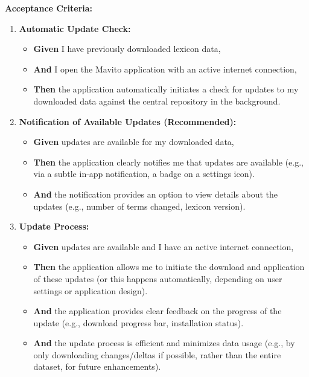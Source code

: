 \documentclass[12pt]{article}
\begin{document}
\vspace{1em}
\textbf{Acceptance Criteria:}
\begin{enumerate}
    \item \textbf{Automatic Update Check:}
    \begin{itemize}
        \item \textbf{Given} I have previously downloaded lexicon data,
        \item \textbf{And} I open the Mavito application with an active internet connection,
        \item \textbf{Then} the application automatically initiates a check for updates to my downloaded data against the central repository in the background.
    \end{itemize}

    \item \textbf{Notification of Available Updates (Recommended):}
    \begin{itemize}
        \item \textbf{Given} updates are available for my downloaded data,
        \item \textbf{Then} the application clearly notifies me that updates are available (e.g., via a subtle in-app notification, a badge on a settings icon).
        \item \textbf{And} the notification provides an option to view details about the updates (e.g., number of terms changed, lexicon version).
    \end{itemize}

    \item \textbf{Update Process:}
    \begin{itemize}
        \item \textbf{Given} updates are available and I have an active internet connection,
        \item \textbf{Then} the application allows me to initiate the download and application of these updates (or this happens automatically, depending on user settings or application design).
        \item \textbf{And} the application provides clear feedback on the progress of the update (e.g., download progress bar, installation status).
        \item \textbf{And} the update process is efficient and minimizes data usage (e.g., by only downloading changes/deltas if possible, rather than the entire dataset, for future enhancements).
    \end{itemize}


\end{enumerate}
\end{document}
